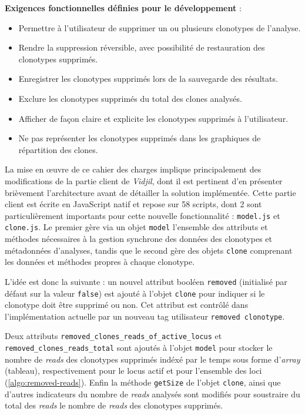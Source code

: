 \textbf{Exigences fonctionnelles définies pour le développement} :
\begin{itemize}
    \item Permettre à l'utilisateur de supprimer un ou plusieurs clonotypes de
          l'analyse.
    \item Rendre la suppression réversible, avec possibilité de restauration
          des clonotypes supprimés.
    \item Enregistrer les clonotypes supprimés lors de la sauvegarde des
          résultats.
    \item Exclure les clonotypes supprimés du total des clones analysés.
    \item Afficher de façon claire et explicite les clonotypes supprimés à
          l'utilisateur.
    \item Ne pas représenter les clonotypes supprimés dans les graphiques de
          répartition des clones.
\end{itemize}

\vspace{1em}

La mise en œuvre de ce cahier des charges implique principalement des
modifications de la partie client de \textit{Vidjil}, dont il est pertinent
d'en présenter brièvement l'architecture avant de détailler la solution
implémentée. Cette partie client est écrite en JavaScript natif et repose sur
58 scripts, dont 2 sont particulièrement importants pour cette nouvelle
fonctionnalité : \texttt{model.js} et \texttt{clone.js}. Le premier gère via un
objet \texttt{model} l'ensemble des attributs et méthodes nécessaires à la
gestion synchrone des données des clonotypes et métadonnées d'analyses, tandis
que le second gère des objets \texttt{clone} comprenant les données et méthodes
propres à chaque clonotype.

L'idée est donc la suivante : un nouvel attribut booléen \texttt{removed}
(initialisé par défaut sur la valeur \texttt{false}) est ajouté à l'objet
\texttt{clone} pour indiquer si le clonotype doit être supprimé ou non. Cet
attribut est contrôlé dans l'implémentation actuelle par un nouveau tag
utilisateur \texttt{removed\ clonotype}. 

Deux attributs \texttt{removed\_clones\_reads\_of\_active\_locus} et
\texttt{removed\_clones\_reads\_total} sont ajoutés à l'objet \texttt{model}
pour stocker le nombre de \textit{reads} des clonotypes supprimés indéxé par le
temps sous forme d'\textit{array} (tableau), respectivement pour le locus actif
et pour l'ensemble des loci (\autoref{algo:removed-reads}). Enfin la méthode
\texttt{getSize} de l'objet \texttt{clone}, ainsi que d'autres indicateurs du
nombre de \textit{reads} analysés sont modifiés pour soustraire du total des
\textit{reads} le nombre de \textit{reads} des clonotypes supprimés.

